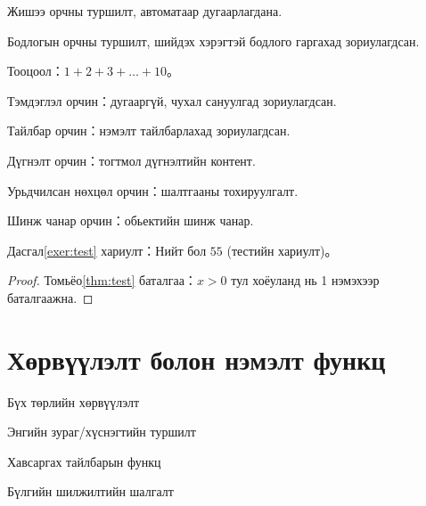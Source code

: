 \documentclass[mn]{../../elegantbook}
\begin{document}
\begin{definition}
\begin{theorem}
\begin{lemma}
\begin{corollary}
\begin{axiom}
\begin{postulate}
\begin{proposition}
\begin{example}\label{exa:test}
Жишээ орчны туршилт, автоматаар дугаарлагдана.
\end{example}

\begin{problem}\label{probl:test}
Бодлогын орчны туршилт, шийдэх хэрэгтэй бодлого гаргахад зориулагдсан.
\end{problem}

\begin{exercise}\label{exer:test}
Тооцоол：$1+2+3+\dots+10$。
\end{exercise}

\begin{note}
Тэмдэглэл орчин：дугааргүй, чухал сануулгад зориулагдсан.
\end{note}

\begin{remark}
Тайлбар орчин：нэмэлт тайлбарлахад зориулагдсан.
\end{remark}

\begin{conclusion}
Дүгнэлт орчин：тогтмол дүгнэлтийн контент.
\end{conclusion}

\begin{assumption}
Урьдчилсан нөхцөл орчин：шалтгааны тохируулгалт.
\end{assumption}

\begin{property}
Шинж чанар орчин：обьектийн шинж чанар.
\end{property}

\begin{solution}
Дасгал\ref{exer:test} хариулт：Нийт бол $55$ (тестийн хариулт)。
\end{solution}

\begin{proof}
Томьёо\ref{thm:test} баталгаа：$x>0$ тул хоёуланд нь 1 нэмэхээр баталгаажна.
\end{proof}

\chapter{Хөрвүүлэлт болон нэмэлт функц}
\begin{introduction}
\item Бүх төрлийн хөрвүүлэлт
\item Энгийн зураг/хүснэгтийн туршилт
\item Хавсаргах тайлбарын функц
\item Бүлгийн шилжилтийн шалгалт
\end{introduction}


\end{proposition}
\end{postulate}
\end{axiom}
\end{corollary}
\end{lemma}
\end{theorem}
\end{definition}
\end{document}
